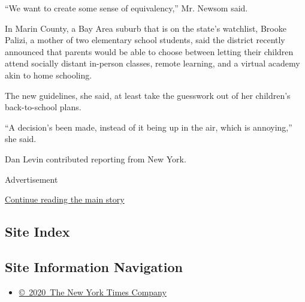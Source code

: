 ``We want to create some sense of equivalency,'' Mr. Newsom said.

In Marin County, a Bay Area suburb that is on the state's watchlist,
Brooke Palizi, a mother of two elementary school students, said the
district recently announced that parents would be able to choose between
letting their children attend socially distant in-person classes, remote
learning, and a virtual academy akin to home schooling.

The new guidelines, she said, at least take the guesswork out of her
children's back-to-school plans.

``A decision's been made, instead of it being up in the air, which is
annoying,'' she said.

Dan Levin contributed reporting from New York.

Advertisement

\protect\hyperlink{after-bottom}{Continue reading the main story}

\hypertarget{site-index}{%
\subsection{Site Index}\label{site-index}}

\hypertarget{site-information-navigation}{%
\subsection{Site Information
Navigation}\label{site-information-navigation}}

\begin{itemize}
\tightlist
\item
  \href{https://help.nytimes3xbfgragh.onion/hc/en-us/articles/115014792127-Copyright-notice}{©~2020~The
  New York Times Company}
\end{itemize}

